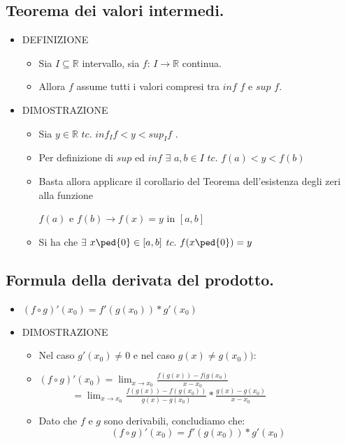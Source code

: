 \documentclass[10pt]{article}
\begin{document}
\subsection{Teorema dei valori intermedi.}
\begin{itemize}
\item
DEFINIZIONE
\begin{itemize}
\item
Sia $I \subseteq \mathbb{R} $ intervallo, sia $f$: $I \rightarrow \mathbb{R} $ continua. 
\item
Allora $f$ assume tutti i valori compresi tra $inf$ $f$ e $sup$ $f$.
\end{itemize}
\medskip
\item
DIMOSTRAZIONE
\begin{itemize}
\item
Sia $y \in \mathbb{R}$ $tc.$ $inf_I f < y <  sup_I f$ . 
\item
Per definizione di $sup$ ed $inf$ $\exists$ $a, b \in I$ $tc.$ $ f(a) < y < f(b)$
\item
Basta allora applicare il corollario del Teorema dell'esistenza degli zeri alla funzione 

$f(a)$ e $f(b) \longrightarrow f(x)= y$ in $[a,b]$
\item
Si ha che $\exists$ $x\ped{0} \in [a, b]$ $tc.$ $f(x\ped{0})=y$
\end{itemize}
\end{itemize}
\medskip \medskip 
\subsection{Formula della derivata del prodotto.}
\begin{itemize}
\item
$(f \circ g)'(x_0) = f'(g(x_0)) * g'(x_0)$
\smallskip
\item DIMOSTRAZIONE
\begin{itemize}
\item
Nel caso $g'(x_0) \neq 0$ e nel caso $g(x) \neq g(x_0))$:
\item 
$(f \circ g)'(x_0) = \displaystyle{{\lim_{x \to x_0}}{\frac{f(g(x)) - f(g(x_0)}{x-x_0}}}$
\subitem
$\; \; \; \; \; \; \; \; \; \; \; \;= \displaystyle{{\lim_{x \to x_0}{\frac{f(g(x)) - f(g(x_0))}{g(x)-g(x_0)} * \frac{g(x) - g(x_0)}{x-x_0}}}}$ \smallskip \smallskip
\item
Dato che $f$ e $g$ sono derivabili, concludiamo che:
$$(f \circ g)'(x_0) = f'(g(x_0)) * g'(x_0)$$
\end{itemize}
\end{itemize}
\medskip \medskip 
\end{document}
